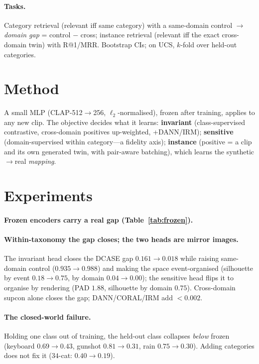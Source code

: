 \documentclass[11pt]{article}
\begin{document}
\paragraph{Tasks.} Category retrieval (relevant iff same category) with a same-domain control
$\to$ \emph{domain gap} = control $-$ cross; instance retrieval (relevant iff the exact
cross-domain twin) with R@1/MRR. Bootstrap CIs; on UCS, $k$-fold over held-out categories.

\section{Method}
A small MLP (CLAP-512$\to$256, $\ell_2$-normalised), frozen after training, applies to any new
clip. The objective decides what it learns: \textbf{invariant} (class-supervised contrastive,
cross-domain positives up-weighted, +DANN/IRM); \textbf{sensitive} (domain-supervised within
category---a fidelity axis); \textbf{instance} (positive = a clip and its own generated twin, with
pair-aware batching), which learns the synthetic$\to$real \emph{mapping}.

\section{Experiments}
\paragraph{Frozen encoders carry a real gap (Table~\ref{tab:frozen}).}
\paragraph{Within-taxonomy the gap closes; the two heads are mirror images.} The invariant head
closes the DCASE gap $0.161\!\to\!0.018$ while raising same-domain control ($0.935\!\to\!0.988$)
and making the space event-organised (silhouette by event $0.18\!\to\!0.75$, by domain
$0.04\!\to\!0.00$); the sensitive head flips it to organise by rendering (PAD $1.88$, silhouette by
domain $0.75$). Cross-domain supcon alone closes the gap; DANN/CORAL/IRM add $<0.002$.
\paragraph{The closed-world failure.} Holding one class out of training, the held-out class
collapses \emph{below} frozen (keyboard $0.69\!\to\!0.43$, gunshot $0.81\!\to\!0.31$, rain
$0.75\!\to\!0.30$). Adding categories does not fix it ($34$-cat: $0.40\!\to\!0.19$).
\end{document}
